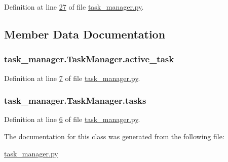 Definition at line \hyperlink{task__manager_8py_source_l00027}{27} of file \hyperlink{task__manager_8py_source}{task\+\_\+manager.\+py}.



\subsection{Member Data Documentation}
\hypertarget{classtask__manager_1_1TaskManager_a3389ea690b2ade9bfe1efa5ad079b777}{
\subsubsection[{active\+\_\+task}]{\setlength{\rightskip}{0pt plus 5cm}task\+\_\+manager.\+Task\+Manager.\+active\+\_\+task}}\label{classtask__manager_1_1TaskManager_a3389ea690b2ade9bfe1efa5ad079b777}


Definition at line \hyperlink{task__manager_8py_source_l00007}{7} of file \hyperlink{task__manager_8py_source}{task\+\_\+manager.\+py}.

\hypertarget{classtask__manager_1_1TaskManager_a13e69f2bbcef1d7ca03e92235cf9772e}{
\subsubsection[{tasks}]{\setlength{\rightskip}{0pt plus 5cm}task\+\_\+manager.\+Task\+Manager.\+tasks}}\label{classtask__manager_1_1TaskManager_a13e69f2bbcef1d7ca03e92235cf9772e}


Definition at line \hyperlink{task__manager_8py_source_l00006}{6} of file \hyperlink{task__manager_8py_source}{task\+\_\+manager.\+py}.



The documentation for this class was generated from the following file\+:\begin{DoxyCompactItemize}
\item 
\hyperlink{task__manager_8py}{task\+\_\+manager.\+py}\end{DoxyCompactItemize}
